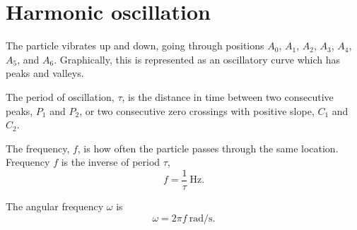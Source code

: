 
\section*{Harmonic oscillation}


The particle vibrates up and down, going through positions $A_0$, $A_1$, $A_2$, $A_3$, $A_4$, $A_5$, and $A_6$. Graphically, this is represented as an oscillatory curve which has peaks and valleys.

The period of oscillation, $\tau$, is the distance in time between two consecutive peaks, $P_1$ and $P_2$, or two consecutive zero crossings with positive slope, $C_1$ and $C_2$.

The frequency, $f$, is how often the particle passes through the same location. Frequency $f$ is the inverse of period $\tau$,
\begin{equation*}
    f=\frac{1}{\tau}\ \mathrm{Hz}.
\end{equation*}

The angular frequency $\omega$ is
\begin{equation*}
    \omega=2\pi f\ \mathrm{rad/s}.
\end{equation*}

